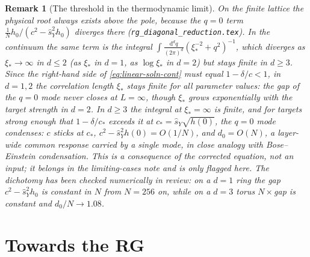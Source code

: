 \documentclass[11pt,a4paper]{article}
\newcommand{\dd}{\mathrm d}
\newcommand{\sY}{\hat s_Y}
\newtheorem{remark}{Remark}
\begin{document}
\begin{remark}[The threshold in the thermodynamic limit]
On the finite lattice the physical root always exists above the pole, because the $q=0$ term $\frac1N h_0/(c^2-\sY^2h_0)$ diverges there (\texttt{rg\_diagonal\_reduction.tex}). In the continuum the same term is the integral $\int\frac{\dd^dq}{(2\pi)^d}(\xi_*^{-2}+q^2)^{-1}$, which diverges as $\xi_*\to\infty$ in $d\le2$ (as $\xi_*$ in $d=1$, as $\log\xi_*$ in $d=2$) but stays finite in $d\ge3$. Since the right-hand side of \eqref{eq:linear-soln-cont} must equal $1-\delta/c<1$, in $d=1,2$ the correlation length $\xi_*$ stays finite for all parameter values: the gap of the $q=0$ mode never closes at $L=\infty$, though $\xi_*$ grows exponentially with the target strength in $d=2$. In $d\ge3$ the integral at $\xi_* = \infty$ is finite, and for targets strong enough that $1-\delta/c_*$ exceeds it at $c_* = \sY\sqrt{h(0)}$, the $q=0$ mode condenses: $c$ sticks at $c_*$, $c^2-\sY^2h(0) = O(1/N)$, and $d_0 = O(N)$, a layer-wide common response carried by a single mode, in close analogy with Bose--Einstein condensation. This is a consequence of the corrected equation, not an input; it belongs in the limiting-cases note and is only flagged here. The dichotomy has been checked numerically in review: on a $d=1$ ring the gap $c^2-\sY^2h_0$ is constant in $N$ from $N = 256$ on, while on a $d=3$ torus $N\times$gap is constant and $d_0/N\to1.08$.
\end{remark}

\section{Towards the RG}
\label{sec:rg}
\end{document}
